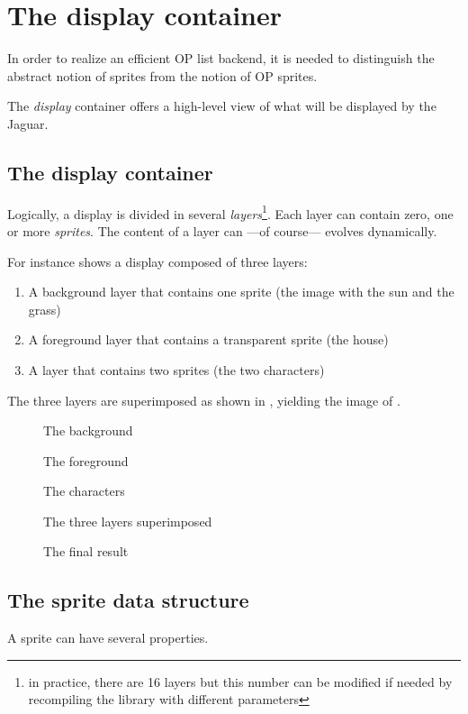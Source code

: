 \chapter{The display container}

In order to realize an efficient OP list backend, it is needed to
distinguish the abstract notion of sprites from the notion of OP
sprites.

The \emph{display} container offers a high-level view of what will be
displayed by the Jaguar.

\section{The display container}
Logically, a display is divided in several \emph{layers}\footnote{in
  practice, there are 16 layers but this number can be modified if
  needed by recompiling the library with different parameters}. Each
layer can contain zero, one or more \emph{sprites}. The content of a
layer can ---of course--- evolves dynamically.

\smallskip

For instance  shows a display composed of three layers:
\begin{enumerate}
\item A background layer  that contains one sprite (the
  image with the sun and the grass)
\item A foreground layer  that contains a transparent
  sprite (the house)
\item A layer  that contains two sprites (the two
  characters)
\end{enumerate}

The three layers are superimposed as shown in , yielding
the image of .

\begin{figure}[htbp]
  \centering
    
  \caption{The background}
  \label{fig:layer1}
\end{figure}

\begin{figure}[htbp]
  \centering
  
  \caption{The foreground}
  \label{fig:layer2}
\end{figure}

\begin{figure}[htbp]
  \centering
  
  \caption{The characters}
  \label{fig:layer3}
\end{figure}

\begin{figure}[htbp]
  \centering
  
  \caption{The three layers superimposed}
  \label{fig:over}
\end{figure}

\begin{figure}[htbp]
  \centering
  
  \caption{The final result}
  \label{fig:final}
\end{figure}

\section{The sprite data structure}
A sprite can have several properties.


